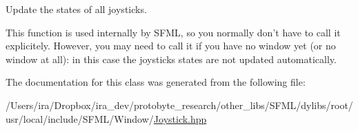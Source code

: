 Update the states of all joysticks. 

This function is used internally by S\-F\-M\-L, so you normally don't have to call it explicitely. However, you may need to call it if you have no window yet (or no window at all)\-: in this case the joysticks states are not updated automatically. 

The documentation for this class was generated from the following file\-:\begin{DoxyCompactItemize}
\item 
/\-Users/ira/\-Dropbox/ira\-\_\-dev/protobyte\-\_\-research/other\-\_\-libs/\-S\-F\-M\-L/dylibs/root/usr/local/include/\-S\-F\-M\-L/\-Window/\hyperlink{_joystick_8hpp}{Joystick.\-hpp}\end{DoxyCompactItemize}
